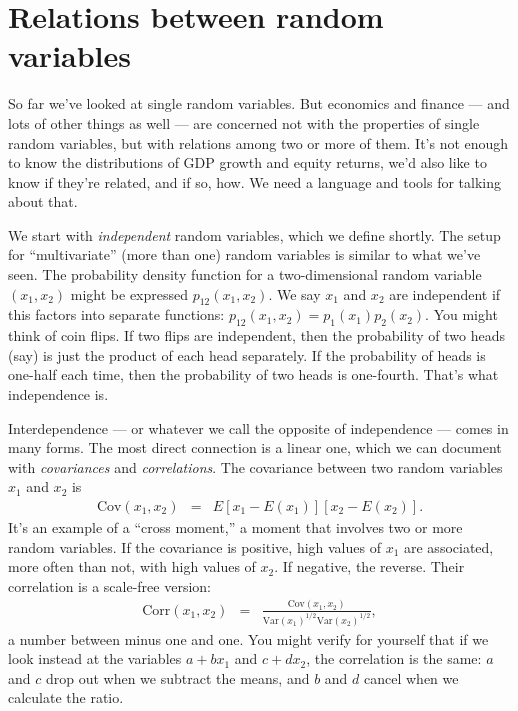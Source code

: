 \documentclass[11pt]{article}
\begin{document}
\section{Relations between random variables}

So far we've looked at single random variables.  
But economics and finance --- and lots of other things as well --- 
are concerned not with the properties
of single random variables, but with relations among two or more of them.
It's not enough to know the distributions of GDP growth
and equity returns,
we'd also like to know if they're related, and if so, how.
We need a language and tools for talking about that.
%

We start with {\it independent\/} random variables, 
which we define shortly.  
The setup for ``multivariate'' (more than one) random variables
is similar to what we've seen.
The probability density function for a two-dimensional random variable
$(x_1,x_2)$ might be expressed $p_{12}(x_1,x_2)$.
We say $x_1$ and $x_2$ are independent if this factors into separate functions:
$p_{12}(x_1,x_2) = p_1(x_1) p_2(x_2) $.
You might think of coin flips.
If two flips are independent, then the probability of two heads (say)
is just the product of each head separately.
If the probability of heads is one-half each time,
then the probability of two heads is one-fourth.
That's what independence is.

Interdependence  ---
or whatever we call the opposite of independence ---
comes in many forms.
The most direct connection is a linear one,
which we can document with {\it covariances\/}
and {\it correlations\/}.
The covariance between two  random variables $x_1$ and $x_2$ is
\begin{eqnarray*}
    \mbox{Cov} (x_1,x_2) &=& E [x_{1} - E({x}_1)] [x_{2} - E({x}_2)] .
\end{eqnarray*}
It's an example of a ``cross moment,''
a moment that involves two or more random variables.
If the covariance is positive, high values of $x_1$ are associated,
more often than not, with high values of $x_2$.
If negative, the reverse.
Their correlation is a scale-free version:
\begin{eqnarray*}
    \mbox{Corr}(x_1,x_2) &=&
            \frac {\mbox{Cov}(x_1,x_2)} {\mbox{Var}(x_1)^{1/2} \mbox{Var}(x_2)^{1/2} } ,
\end{eqnarray*}
a number between minus one and one.
You might verify for yourself that if we look instead at the
variables $a + bx_1$ and $c + dx_2$, the correlation is the same:
$a$ and $c$ drop out when we subtract the means, and
$b$ and $d$ cancel when we calculate the ratio.
\end{document}
